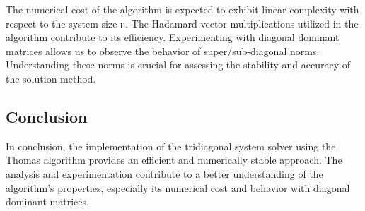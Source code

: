 The numerical cost of the algorithm is expected to exhibit linear complexity with respect to the system size \texttt{n}. The Hadamard vector multiplications utilized in the algorithm contribute to its efficiency.\newline
Experimenting with diagonal dominant matrices allows us to observe the behavior of super/sub-diagonal norms. Understanding these norms is crucial for assessing the stability and accuracy of the solution method.

\subsection*{Conclusion}

In conclusion, the implementation of the tridiagonal system solver using the Thomas algorithm provides an efficient and numerically stable approach. The analysis and experimentation contribute to a better understanding of the algorithm's properties, especially its numerical cost and behavior with diagonal dominant matrices.

